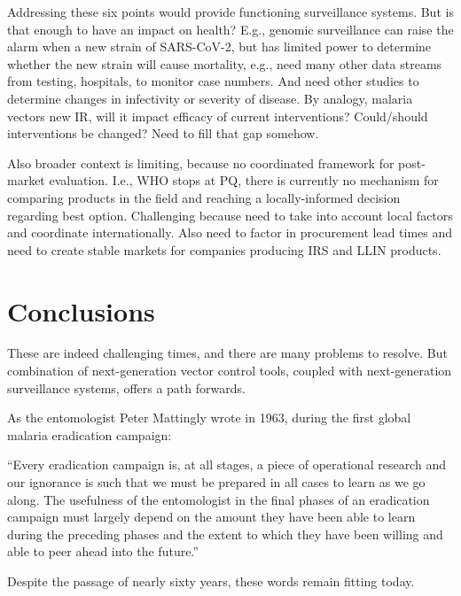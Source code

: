 \documentclass[a4paper,11pt,abstracton,hidelinks]{scrartcl}
\begin{document}
Addressing these six points would provide functioning surveillance systems.
%
But is that enough to have an impact on health?
%
E.g., genomic surveillance can raise the alarm when a new strain of SARS-CoV-2, but has limited power to determine whether the new strain will cause mortality, e.g., need many other data streams from testing, hospitals, to monitor case numbers.
And need other studies to determine changes in infectivity or severity of disease.
%
By analogy, malaria vectors new IR, will it impact efficacy of current interventions?
Could/should interventions be changed?
Need to fill that gap somehow.


Also broader context is limiting, because no coordinated framework for post-market evaluation.
%
I.e., WHO stops at PQ, there is currently no mechanism for comparing products in the field and reaching a locally-informed decision regarding best option.
%
Challenging because need to take into account local factors and coordinate internationally.
%
Also need to factor in procurement lead times and need to create stable markets for companies producing IRS and LLIN products.


\section{Conclusions}\label{sec:conclusions}


These are indeed challenging times, and there are many problems to resolve.
But combination of next-generation vector control tools, coupled with next-generation surveillance systems, offers a path forwards.


As the entomologist Peter Mattingly wrote in 1963, during the first global malaria eradication campaign:


\begin{displayquote}
``Every eradication campaign is, at all stages, a piece of operational research and our ignorance is such that we must be prepared in all cases to learn as we go along. The usefulness of the entomologist in the final phases of an eradication campaign must largely depend on the amount they have been able to learn during the preceding phases and the extent to which they have been willing and able to peer ahead into the future.''
\end{displayquote}


Despite the passage of nearly sixty years, these words remain fitting today.


\printbibliography
\end{document}
